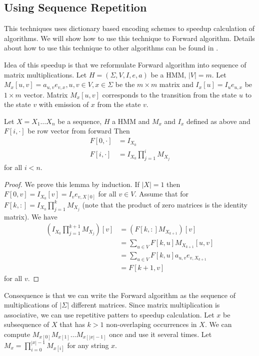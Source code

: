 \subsection{Using Sequence Repetition}

This techniques uses dictionary based encoding schemes to speedup calculation of
algorithms. We will show how to use this technique to Forward algorithm. Details
about how to use this technique to other algorithms can be found in
\cite{Lifshits2009}.


Idea of this speedup is that we reformulate Forward algorithm into sequence of
matrix multiplications.
Let $H=(\Sigma,V,I,e,a)$ be a HMM, $|V|=m$.  Let $M_x[u,v]=a_{u,v}e_{v,x},
u,v\in V,x\in \Sigma$ be the $m\times m$ matrix and $I_x[u]=I_ue_{u,x}$ be
$1\times m$ vector. Matrix $M_x[u,v]$ corresponds to the transition from the
state $u$ to the state $v$ with emission of $x$ from the state $v$.

\begin{lemma}\label{LEMA:MATRIXMULTI}
Let $X=X_1\dots X_n$ be a sequence, $H$ a HMM and $M_x$ and $I_x$ defined as above and
$F[i,\cdot]$ be row vector from forward
Then
\begin{align}
F[0,\cdot] &= I_{X_0}\\
F[i,\cdot] &= I_{X_0}\prod_{j=1}^i M_{X_j}
\end{align}
for all $i< n$.
\end{lemma}

\begin{proof}
We prove this lemma by induction.  If $|X|=1$ then
$F[0,v]=I_{X_0}[v]=I_{v}e_{v,X[0]}$ for all $v\in V$.  Assume that for
$F[k,:] = I_{X_0}\prod_{j=1}^k M_{X_j}$ (note that the  product of zero matrices
is the identity matrix). We have 
\begin{align*}
\left(I_{X_0}\prod_{j=1}^{k+1} M_{X_j}\right)[v] &= 
\left(F[k,:] M_{X_{k+1}}\right)[v]\\ &= \sum_{u\in V} F[k,u]
M_{X_{k+1}}[u,v]\\ &= \sum_{u\in V} F[k,u] a_{u,v}e_{v,X_{k+1} } \\&= F[k+1,v] 
\end{align*}
for all $v$. 
\end{proof}

Consequence is that we can write the Forward algorithm as the sequence of
multiplications of $|\Sigma|$ different matrices. Since matrix multiplication
is associative, we can use repetitive patters to speedup calculation. 
Let $x$ be subsequence of $X$ that has $k>1$ non-overlaping occurrences in $X$.
We can compute $M_{x[0]}M_{x[1]}\dots M_{x[{|x|-1}]}$ once and use it several
times. Let $M_{x}=\prod_{i=0}^{|x|-1}M_{x[i]}$ for any string $x$.

